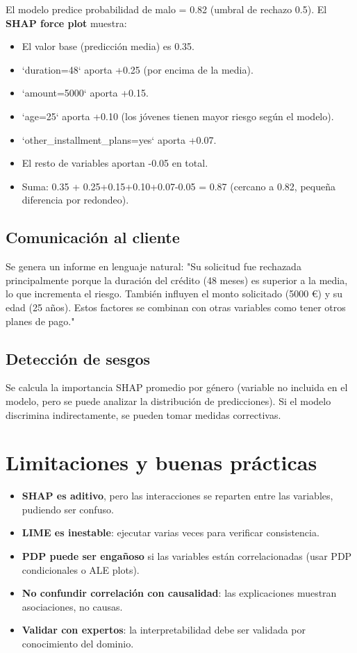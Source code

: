 \documentclass[12pt,a4paper,openany,oneside]{book}
\begin{document}
El modelo predice probabilidad de malo = 0.82 (umbral de rechazo 0.5). El \textbf{SHAP force plot} muestra:
\begin{itemize}
    \item El valor base (predicción media) es 0.35.
    \item `duration=48` aporta +0.25 (por encima de la media).
    \item `amount=5000` aporta +0.15.
    \item `age=25` aporta +0.10 (los jóvenes tienen mayor riesgo según el modelo).
    \item `other\_installment\_plans=yes` aporta +0.07.
    \item El resto de variables aportan -0.05 en total.
    \item Suma: 0.35 + 0.25+0.15+0.10+0.07-0.05 = 0.87 (cercano a 0.82, pequeña diferencia por redondeo).
\end{itemize}

\subsection{Comunicación al cliente}
Se genera un informe en lenguaje natural: "Su solicitud fue rechazada principalmente porque la duración del crédito (48 meses) es superior a la media, lo que incrementa el riesgo. También influyen el monto solicitado (5000 €) y su edad (25 años). Estos factores se combinan con otras variables como tener otros planes de pago."

\subsection{Detección de sesgos}
Se calcula la importancia SHAP promedio por género (variable no incluida en el modelo, pero se puede analizar la distribución de predicciones). Si el modelo discrimina indirectamente, se pueden tomar medidas correctivas.

\section{Limitaciones y buenas prácticas}

\begin{itemize}
    \item \textbf{SHAP es aditivo}, pero las interacciones se reparten entre las variables, pudiendo ser confuso.
    \item \textbf{LIME es inestable}: ejecutar varias veces para verificar consistencia.
    \item \textbf{PDP puede ser engañoso} si las variables están correlacionadas (usar PDP condicionales o ALE plots).
    \item \textbf{No confundir correlación con causalidad}: las explicaciones muestran asociaciones, no causas.
    \item \textbf{Validar con expertos}: la interpretabilidad debe ser validada por conocimiento del dominio.
\end{itemize}
\end{document}
